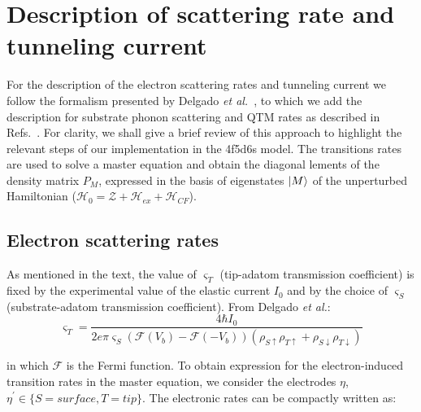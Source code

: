 \documentclass[reprint,amsmath,amssymb,aps,nofootinbib,onecolumn]{revtex4-2}
\begin{document}
\section{Description of scattering rate and tunneling current}

For the description of the electron scattering rates and tunneling current we follow the formalism presented by Delgado \textit{et al.}~\cite{delgado2010}, to which we add the description for substrate phonon scattering \cite{politi_tunneling_1995,cervetti2016} and QTM rates as described in Refs.~\cite{abragam1961,fort1998}. For clarity, we shall give a brief review of this approach to highlight the relevant steps of our implementation in the 4f5d6s model.
The  transitions rates are used to solve a master equation and obtain the diagonal lements of the density matrix $P_M$, expressed in the basis of eigenstates $\ket{M}$ of the unperturbed Hamiltonian ($\mathcal{H_0=\mathcal{Z}}+\mathcal{H}_{ex}+\mathcal{H}_{CF}$).

\subsection{Electron scattering rates}
As mentioned in the text, the value of $\varsigma_T$ (tip-adatom transmission coefficient) is fixed by the experimental value of the elastic current $I_0$ and by the choice of $\varsigma_S$ (substrate-adatom transmission coefficient). From Delgado \textit{et al.}:
\begin{equation}
\varsigma_{T} =  \dfrac{4 \hbar I_0}{2 e \pi \varsigma_{S} \left( \mathcal{F}(V_{b})-\mathcal{F}(-V_{b}) \right)\left( \rho_{S \uparrow} \rho_{T\uparrow} + \rho_{S \downarrow} \rho_{T\downarrow} \right)}
\label{eq:sigmaT}
\end{equation} 

in which $\mathcal{F}$ is the Fermi function. To obtain expression for the electron-induced transition rates in the master equation, we consider the electrodes $\eta$, $\eta^{\prime} \in\lbrace S=surface, T=tip\rbrace$. The electronic rates can be compactly written as:
\end{document}
